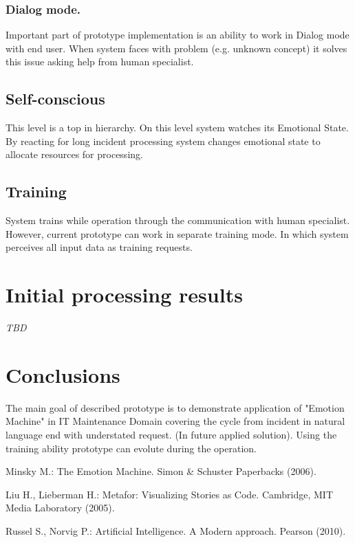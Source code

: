 \documentclass[runningheads,a4paper]{llncs}
\begin{document}
\subsubsection{Dialog mode.}
Important part of prototype implementation is an ability to work in Dialog mode with end user. When system faces with problem (e.g. unknown concept) it solves this issue asking help from human specialist.

\subsection{Self-conscious}
This level is a top in hierarchy. On this level system watches its Emotional State. By reacting for long incident processing system changes emotional state to allocate resources for processing.

\subsection{Training}
System trains while operation through the communication with human specialist. However, current prototype can work in separate training mode. In which system perceives all input data as training requests.

\section{Initial processing results}

\emph{TBD}

\section{Conclusions}

The main goal of described prototype is to demonstrate application of "Emotion Machine" \cite{minsk} in IT Maintenance Domain covering the cycle from incident in natural language end with understated request. (In future applied solution). Using the training ability prototype can evolute during the operation.

\begin{thebibliography}{4}

Minsky M.:
The Emotion Machine.
Simon \& Schuster Paperbacks  (2006).

Liu H., Lieberman H.:
Metafor: Visualizing Stories as Code.
Cambridge, MIT Media Laboratory  (2005).

Russel S., Norvig P.:
Artificial Intelligence. A Modern approach.
Pearson (2010).

\end{thebibliography}
\end{document}
